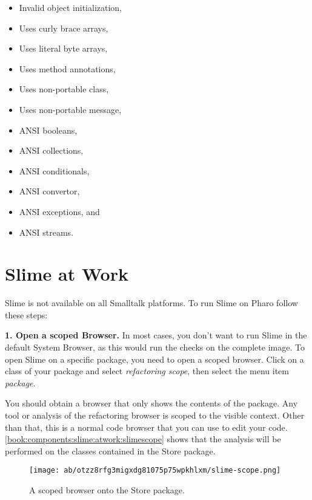 \documentclass[a4paper,10pt,twoside]{book}
\newcommand{\ct}[1]{{\small\ttfamily\textup{#1}}}
\begin{document}
\begin{itemize}
\item  Invalid object initialization,
\item  Uses curly brace arrays,
\item  Uses literal byte arrays,
\item  Uses method annotations,
\item  Uses non-portable class,
\item  Uses non-portable message,
\item  ANSI booleans,
\item  ANSI collections,
\item  ANSI conditionals,
\item  ANSI convertor,
\item  ANSI exceptions, and
\item  ANSI streams.
\end{itemize}

\section{Slime at Work}
\label{book:components:slime:atwork}

Slime is not available on all Smalltalk platforms. To run Slime on Pharo follow these steps:

\textbf{1. Open a scoped Browser.} In most cases, you don't want to run Slime in the default System Browser, as this would run the checks on the complete image. To open Slime on a specific package, you need to open a scoped browser. Click on a class of your package and select \textit{refactoring scope}, then select the menu item \textit{package}.

You should obtain a browser that only shows the contents of the package. Any tool or analysis of the refactoring browser is scoped to the visible context. Other than that, this is a normal code browser that you can use to edit your code. \autoref{book:components:slime:atwork:slimescope} shows that the analysis will be performed on the classes contained in the \ct{Store} package.

\begin{figure}[h!tbp]
	\begin{center}
		\texttt{[image: ab/otzz8rfg3migxdg81075p75wpkhlxm/slime-scope.png]}
		\caption{A scoped browser onto the Store package.\label{book:components:slime:atwork:slimescope}}
	\end{center}
\end{figure}
\end{document}
